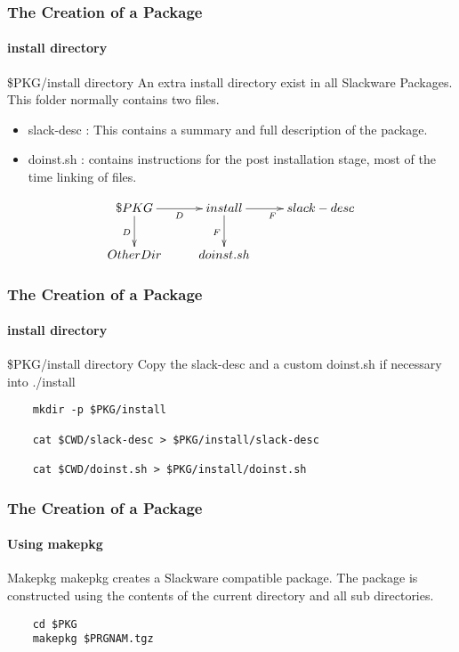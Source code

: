 \documentclass[12pt,hyperref={pdfpagelabels=true}]{beamer}
\begin{document}
\begin{frame}[fragile]
  \frametitle{The Creation of a Package}
  \framesubtitle{install directory}
  \begin{block}{\$PKG/install directory}
    An extra install directory exist in all Slackware Packages.
    This folder normally contains two files.
    \begin{itemize}[<+-| alert@+>]
    \item slack-desc : This contains a summary and full description of the
      package.
    \item doinst.sh : contains instructions for the post installation stage,
      most of the time linking of files.
    \end{itemize}
  \end{block}

  \pause
  
  \begin{equation*}
    \xymatrix@C=2pc@R=2pc{
      \$PKG\/\ar[r]_D\ar[d]_D & install\ar[r]_F\ar[d]_F & slack-desc\\
      OtherDir  & doinst.sh  }
  \end{equation*}
\end{frame}

\begin{frame}[fragile]
  \frametitle{The Creation of a Package}
  \framesubtitle{install directory}
  \begin{block}{\$PKG/install directory}
    Copy the slack-desc and a custom doinst.sh if necessary into ./install
  \end{block}
  
  \pause
  
  \begin{lstlisting}
    mkdir -p $PKG/install
    
    cat $CWD/slack-desc > $PKG/install/slack-desc
    
    cat $CWD/doinst.sh > $PKG/install/doinst.sh
  \end{lstlisting}
\end{frame}


\begin{frame}[fragile]
  \frametitle{The Creation of a Package}
  \framesubtitle{Using makepkg}
  \begin{block}{Makepkg}
    makepkg creates a Slackware compatible package. The package is constructed
    using the contents of the current directory and all sub directories.
  \end{block}
  
  \pause
  
  \begin{lstlisting}
    cd $PKG
    makepkg $PRGNAM.tgz
  \end{lstlisting}
\end{frame}
\end{document}
